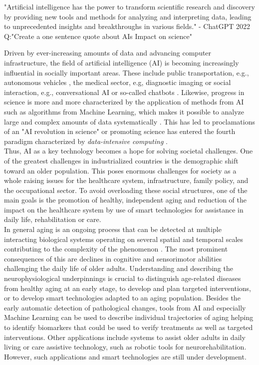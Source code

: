 "Artificial intelligence has the power to transform scientific research and discovery by providing new tools and methods for analyzing and interpreting data, leading to unprecedented insights and breakthroughs in various fields." - ChatGPT 2022 Q:"Create a one sentence quote about AIs Impact on science"

Driven by ever-increasing amounts of data and advancing computer infrastructure, the field of artificial intelligence (AI) is becoming increasingly influential in socially important areas. These include public transportation, e.g., autonomous vehicles \cite{Leonard2020}, the medical sector, e.g, diagnostic imaging \cite{Liu2020} or social interaction, e.g., conversational AI or so-called chatbots \cite{Adamopoulou2020}. Likewise, progress in science is more and more characterized by the application of methods from AI such as algorithms from Machine Learning, which makes it possible to analyze large and complex amounts of data systematically \cite{Brunton2019}. This has led to proclamations of an "AI revolution in science" \cite{Appenzeller2017} or promoting science has entered the fourth paradigm characterized by \textit{data-intensive computing} \cite{Hey2009}.\\
Thus, AI as a key technology becomes a hope for solving societal challenges. One of the greatest challenges in industrialized countries is the demographic shift toward an older population. This poses enormous challenges for society as a whole raising issues for the healthcare system, infrastructure, family policy, and the occupational sector. To avoid overloading these social structures, one of the main goals is the promotion of healthy, independent aging and reduction of the impact on the healthcare system by use of smart technologies for assistance in daily life, rehabilitation or care.\\ 
In general aging is an ongoing process that can be detected at multiple interacting biological systems operating on several spatial and temporal scales contributing to the complexity of the phenomenon \cite{Mooney2016}. The most prominent consequences of this are declines in cognitive and sensorimotor abilities challenging the daily life of older adults. Understanding and describing the neurophysiological underpinnings is crucial to distinguish age-related diseases from healthy aging at an early stage, to develop and plan targeted interventions, or to develop smart technologies adapted to an aging population. Besides the early automatic detection of pathological changes, tools from AI and especially Machine Learning can be used to describe individual trajectories of aging helping to identify biomarkers that could be used to verify treatments as well as targeted interventions. Other applications include systems to assist older adults in daily living or care assistive technology, such as robotic tools for neurorehabilitation. However, such applications and smart technologies are still under development.\\
